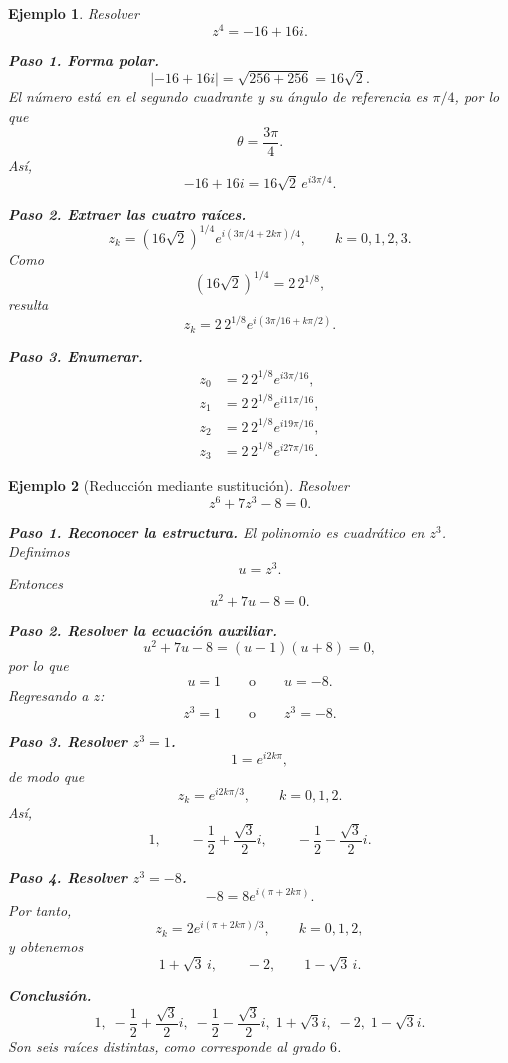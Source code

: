 \documentclass[12pt]{article}
\newtheorem{ejemplo}{Ejemplo}[section]
\begin{document}
\begin{ejemplo}
Resolver
\[
z^4=-16+16i.
\]

\textbf{Paso 1. Forma polar.}
\[
|-16+16i|=\sqrt{256+256}=16\sqrt2.
\]
El número está en el segundo cuadrante y su ángulo de referencia es $\pi/4$,
por lo que
\[
\theta=\frac{3\pi}{4}.
\]
Así,
\[
-16+16i=16\sqrt2\,e^{i3\pi/4}.
\]

\textbf{Paso 2. Extraer las cuatro raíces.}
\[
z_k=(16\sqrt2)^{1/4}
e^{i(3\pi/4+2k\pi)/4},
\qquad k=0,1,2,3.
\]
Como
\[
(16\sqrt2)^{1/4}=2\,2^{1/8},
\]
resulta
\[
z_k=2\,2^{1/8}e^{i(3\pi/16+k\pi/2)}.
\]

\textbf{Paso 3. Enumerar.}
\[
\boxed{
\begin{aligned}
z_0&=2\,2^{1/8}e^{i3\pi/16},\\
z_1&=2\,2^{1/8}e^{i11\pi/16},\\
z_2&=2\,2^{1/8}e^{i19\pi/16},\\
z_3&=2\,2^{1/8}e^{i27\pi/16}.
\end{aligned}}
\]
\end{ejemplo}

\begin{ejemplo}[Reducción mediante sustitución]
Resolver
\[
z^6+7z^3-8=0.
\]

\textbf{Paso 1. Reconocer la estructura.}
El polinomio es cuadrático en $z^3$. Definimos
\[
u=z^3.
\]
Entonces
\[
u^2+7u-8=0.
\]

\textbf{Paso 2. Resolver la ecuación auxiliar.}
\[
u^2+7u-8=(u-1)(u+8)=0,
\]
por lo que
\[
u=1\qquad\text{o}\qquad u=-8.
\]
Regresando a $z$:
\[
z^3=1
\qquad\text{o}\qquad
z^3=-8.
\]

\textbf{Paso 3. Resolver $z^3=1$.}
\[
1=e^{i2k\pi},
\]
de modo que
\[
z_k=e^{i2k\pi/3},\qquad k=0,1,2.
\]
Así,
\[
1,\qquad
-\frac12+\frac{\sqrt3}{2}i,\qquad
-\frac12-\frac{\sqrt3}{2}i.
\]

\textbf{Paso 4. Resolver $z^3=-8$.}
\[
-8=8e^{i(\pi+2k\pi)}.
\]
Por tanto,
\[
z_k=2e^{i(\pi+2k\pi)/3},\qquad k=0,1,2,
\]
y obtenemos
\[
1+\sqrt3\,i,\qquad -2,\qquad 1-\sqrt3\,i.
\]

\textbf{Conclusión.}
\[
\boxed{
1,\;
-\frac12+\frac{\sqrt3}{2}i,\;
-\frac12-\frac{\sqrt3}{2}i,\;
1+\sqrt3 i,\;
-2,\;
1-\sqrt3 i.
}
\]
Son seis raíces distintas, como corresponde al grado $6$.
\end{ejemplo}
\end{document}

